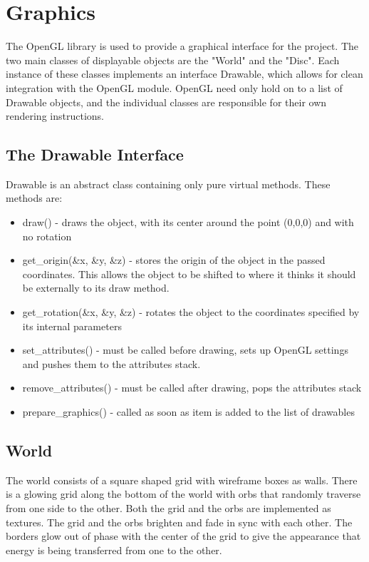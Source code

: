 \documentclass[pdftext,twoside,10pt]{article}
\begin{document}
\section{Graphics}
The OpenGL library is used to provide a graphical interface for the project. The two main classes of displayable objects are the "World" and the "Disc". Each instance of these classes implements an interface Drawable, which allows for clean integration with the OpenGL module. OpenGL need only hold on to a list of Drawable objects, and the individual classes are responsible for their own rendering instructions.

\subsection{The Drawable Interface}
Drawable is an abstract class containing only pure virtual methods. These methods are:

\begin{itemize}
    \item draw() - draws the object, with its center around the point (0,0,0) and with no rotation
    \item get\_origin(\&x, \&y, \&z) - stores the origin of the object in the passed coordinates. This allows the object to be shifted to where it thinks it should be externally to its draw method.
    \item get\_rotation(\&x, \&y, \&z) - rotates the object to the coordinates specified by its internal parameters
    \item set\_attributes() - must be called before drawing, sets up OpenGL settings and pushes them to the attributes stack.
    \item remove\_attributes() - must be called after drawing, pops the attributes stack
    \item prepare\_graphics() - called as soon as item is added to the list of drawables 
\end{itemize} 

\subsection{World}
The world consists of a square shaped grid with wireframe boxes as walls. There is a glowing grid along the bottom of the world with orbs that randomly traverse from one side to the other. Both the grid and the orbs are implemented as textures. The grid and the orbs brighten and fade in sync with each other. The borders glow out of phase with the center of the grid to give the appearance that energy is being transferred from one to the other.
\end{document}

